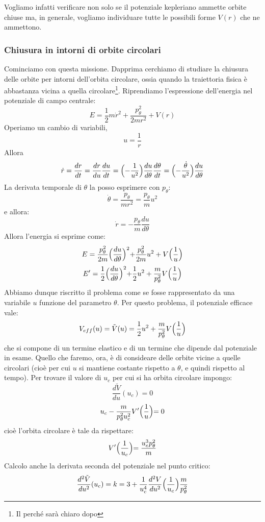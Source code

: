 \documentclass[a4paper,openany]{article}
\begin{document}
	Vogliamo infatti verificare non solo se il potenziale kepleriano ammette orbite chiuse ma, in generale, vogliamo individuare tutte le possibili forme $V(r)$ che ne ammettono.
	\subsubsection{Chiusura in intorni di orbite circolari}
	Cominciamo con questa missione. Dapprima cerchiamo di studiare la chiusura delle orbite per intorni dell'orbita circolare, ossia quando la traiettoria fisica è abbastanza vicina a quella circolare\footnote{Il perché sarà chiaro dopo}. Riprendiamo l'espressione dell'energia nel potenziale di campo centrale:
	$$
	E = \dfrac{1}{2}m\dot{r}^{2} + \dfrac{p_{\theta}^2}{2mr^2}+V(r)
	$$
	Operiamo un cambio di variabili, 
	$$
	u = \dfrac{1}{r}
	$$
	Allora
	$$
	\dot{r} = \dfrac{dr}{dt} = \dfrac{dr}{du}\dfrac{du}{dt} = \Bigl(-\dfrac{1}{u^2}\Bigl)\dfrac{du}{d\theta}\dfrac{d\theta}{dt} = \Bigl(-\dfrac{\dot{\theta}}{u^2}\Bigl)\dfrac{du}{d\theta}
	$$
	La derivata temporale di $\theta$ la posso esprimere con $p_{\theta}$:
	$$
	\dot{\theta} = \dfrac{p_{\theta}}{mr^2} = \dfrac{p_{\theta}}{m}u^2 
	$$
	e allora:
	$$
	\dot{r} = - \dfrac{p_{\theta}}{m}\dfrac{du}{d\theta}
	$$
	Allora l'energia si esprime come:
	$$
	E = \dfrac{p_{\theta}^{2}}{2m}\Bigl(\dfrac{du}{d\theta}\Bigl)^2 + \dfrac{p_{\theta}^2}{2m}u^2 + V\Bigl(\dfrac{1}{u}\Bigl)
	$$
	$$
	E' = \dfrac{1}{2}\Bigl(\dfrac{du}{d\theta}\Bigl)^2 + \dfrac{1}{2}u^2 + \dfrac{m}{p_{\theta}^2} V\Bigl(\dfrac{1}{u}\Bigl)
	$$
	Abbiamo dunque riscritto il problema come se fosse rappresentato da una variabile $u$ funzione del parametro $\theta$. Per questo problema, il potenziale efficace vale:
	$$
	V_{eff}(u) = \tilde{V}(u) = \dfrac{1}{2}u^2 + \dfrac{m}{p_{\theta}^2} V\Bigl(\dfrac{1}{u}\Bigl)
	$$
	che si compone di un termine elastico e di un termine che dipende dal potenziale in esame. Quello che faremo, ora, è di consideare delle orbite vicine a quelle circolari (cioè per cui $u$ si mantiene costante rispetto a $\theta$, e quindi rispetto al tempo). Per trovare il valore di $u_c$ per cui si ha orbita circolare impongo:
	$$
	\dfrac{d\tilde{V}}{du}(u_c) = 0
	$$
	$$
	u_c - \dfrac{m}{p_{\theta}^2 u_c^{2}} V'\Bigl(\dfrac{1}{u}\Bigl) = 0
	$$
	cioè l'orbita circolare è tale da rispettare:
	\begin{equation}
		V'\Bigl(\dfrac{1}{u_c}\Bigl) = \dfrac{u_c^3 p_{\theta}^2}{m}
		\label{eqref}
	\end{equation}
	Calcolo anche la derivata seconda del potenziale nel punto critico:
	$$
	\dfrac{d^2\tilde{V}}{du^2}(u_c) = k = 3 + \dfrac{1}{u_c^4}\dfrac{d^2 V}{du^2}\Bigl(\dfrac{1}{u_c}\Bigl) \dfrac{m}{p_\theta^2}
	$$
\end{document}
